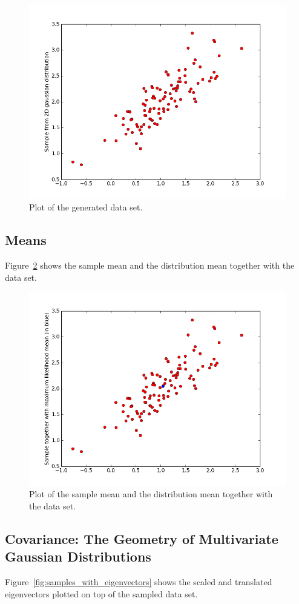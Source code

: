 \documentclass[a4paper]{article}
\begin{document}
\begin{figure}[ht]
  \centering
  \includegraphics[width=.8\linewidth]{figures/samples.png}
  \caption{Plot of the generated data set.}
  \label{fig:samples}
\end{figure}

\subsection{Means}
Figure~\ref{fig:samples_with_mean} shows the sample mean and the distribution mean together with the data set.

\begin{figure}[ht]
  \centering
  \includegraphics[width=.8\linewidth]{figures/samples_with_mean.png}
  \caption{Plot of the sample mean and the distribution mean together with the data set.}
  \label{fig:samples_with_mean}
\end{figure}

\subsection{Covariance: The Geometry of Multivariate Gaussian Distributions}
Figure~\ref{fig:samples_with_eigenvectors} shows the scaled and translated eigenvectors plotted on top of the sampled data set.
\end{document}
